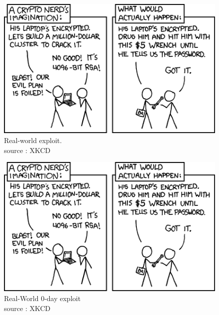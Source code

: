 \begin{figure}[hb!]
    \centering
       \includegraphics{images/rubberhose.png}
	\caption{Real-world exploit. \\ source : XKCD}
	\label{fig:RC4}
\end{figure}

\begin{figure}[hb!]
    \centering
       \includegraphics{images/rubberhose.png}
	\caption{ Real-World 0-day exploit \\ source : XKCD}
	\label{fig:RC4}
\end{figure}
